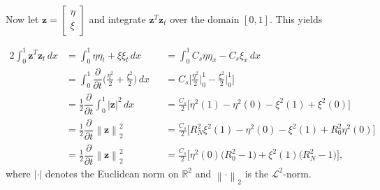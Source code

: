 \documentclass[12pt]{article}
\newcommand{\norm}[1]{\left\lVert#1\right\rVert}
\begin{document}
\begin{flushleft}
Now let $\mathbf{z} = \begin{bmatrix}
\eta\\
\xi
\end{bmatrix}$ and integrate $\mathbf{z}^T \mathbf{z}_t$ over the domain $[0,1]$. This yields

\begin{alignat*}{2}
\int_0^1 \mathbf{z}^{T} \mathbf{z}_t \, dx & = \int_0^1 \eta \eta_t + \xi \xi_t \, dx && = \int_0^1 C_s \eta \eta_x - C_s \xi_x \, dx\\
& = \int_0^1 \dfrac{\partial}{\partial t} \bigg ( \frac{\eta^2}{2} + \frac{\xi^2}{2} \bigg ) \, dx && = C_s \bigg [ \frac{\eta^2}{2} \bigg |_0^1 - \frac{\xi^2}{2} \bigg |_0^1  \bigg ]\\
&= \frac{1}{2} \dfrac{\partial}{\partial t} \int_0^1 |\mathbf{z}|^2 \, dx && = \frac{C_s}{2} \bigg [\eta^2(1)-\eta^2(0) -\xi^2(1) + \xi^2(0) \bigg ]\\
& = \frac{1}{2} \dfrac{\partial}{\partial t} \norm{\mathbf{z}}_2^2 && = \frac{C_s}{2} \bigg [ R_N^2 \xi^2(1) - \eta^2(0) - \xi^2(1) + R_0^2\eta^2(0) \bigg ]\\
& = \frac{1}{2} \dfrac{\partial}{\partial t} \norm{\mathbf{z}}_2^2 && = \frac{C_s}{2} \bigg [\eta^2(0) \big (R_0^2 - 1 \big ) + \xi^2(1) \big ( R_N^2 - 1 \big )    \bigg ],
\end{alignat*}
where $|\cdot |$ denotes the Euclidean norm on $\mathbb{R}^2$ and $ \norm{\cdot}_2 $ is the $\mathcal{L}^2$-norm. 
\end{flushleft}
\end{document}
